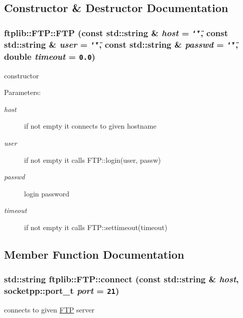\subsection{Constructor \& Destructor Documentation}
\hypertarget{classftplib_1_1FTP_178979abdc58593abdb31a882f370803}{
\subsubsection{\setlength{\rightskip}{0pt plus 5cm}ftplib::FTP::FTP (const std::string \& {\em host} = {\tt \char`\"{}\char`\"{}}, \/  const std::string \& {\em user} = {\tt \char`\"{}\char`\"{}}, \/  const std::string \& {\em passwd} = {\tt \char`\"{}\char`\"{}}, \/  double {\em timeout} = {\tt 0.0})}}
\label{classftplib_1_1FTP_178979abdc58593abdb31a882f370803}


constructor 

\begin{Desc}
\item[Parameters:]
\begin{description}
\item[{\em host}]if not empty it connects to given hostname \item[{\em user}]if not empty it calls FTP::login(user, passw) \item[{\em passwd}]login password \item[{\em timeout}]if not empty it calls FTP::settimeout(timeout) \end{description}
\end{Desc}


\subsection{Member Function Documentation}
\hypertarget{classftplib_1_1FTP_fbd3444a33e5dd055474c9a0d6aabba5}{
\subsubsection{\setlength{\rightskip}{0pt plus 5cm}std::string ftplib::FTP::connect (const std::string \& {\em host}, \/  socketpp::port\_\-t {\em port} = {\tt 21})}}
\label{classftplib_1_1FTP_fbd3444a33e5dd055474c9a0d6aabba5}


connects to given \hyperlink{classftplib_1_1FTP}{FTP} server 

